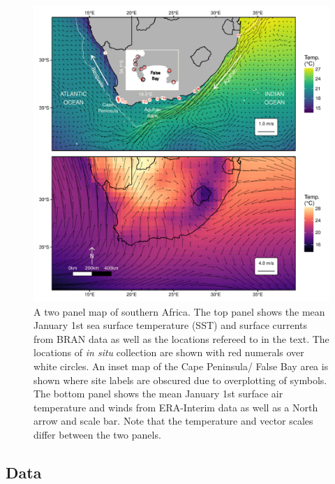 \documentclass[a4paper,10pt,review]{elsarticle}
\begin{document}
\begin{figure}
\includegraphics[width=1.0\textwidth]{figure_1.pdf}
\caption{A two panel map of southern Africa. The top panel shows the mean January 1st sea surface temperature (SST) and surface currents from BRAN data as well as the locations refereed to in the text. The locations of \emph{in situ} collection are shown with red numerals over white circles. An inset map of the Cape Peninsula/ False Bay area is shown where site labels are obscured due to overplotting of symbols. The bottom panel shows the mean January 1st surface air temperature and winds from ERA-Interim data as well as a North arrow and scale bar. Note that the temperature and vector scales differ between the two panels.}
\label{figure1}
\end{figure}

\subsection{Data}
\end{document}
